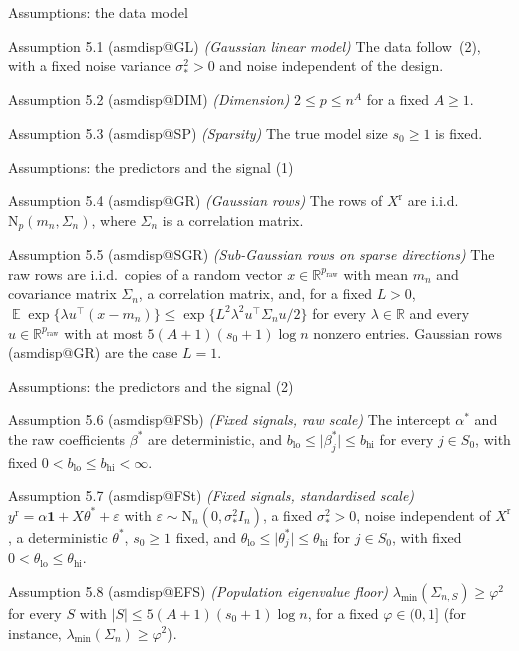 \documentclass[aspectratio=169]{beamer}
\makeatletter
\newcommand{\asmdisp}[1]{\csname asmdisp@#1\endcsname}
\newcommand{\as}[1]{\textup{(\asmdisp{#1})}}
\newcommand{\R}{\mathbb{R}}
\newcommand{\one}{\mathbf{1}}
\newcommand{\abs}[1]{\lvert #1\rvert}
\DeclareMathOperator{\E}{\mathbb{E}}
\newcommand{\Normal}{\mathrm{N}}
\newcommand{\lmin}{\lambda_{\min}}
\newcommand{\yr}{y^{\mathrm r}}
\newcommand{\Xr}{X^{\mathrm r}}
\newcommand{\praw}{p_{\mathrm{raw}}}
\newcommand{\sigs}{\sigma_*}
\newcommand{\bstar}{\beta^*}
\newcommand{\tstar}{\theta^*}
\newcommand{\Sz}{S_0}
\newcommand{\sz}{s_0}
\newcommand{\Sig}{\Sigma_n}
\makeatother
\begin{document}
\begin{frame}{Assumptions: the data model}
\small
\begin{block}{Assumption 5.1 (\asmdisp{GL}) \textit{(Gaussian linear model)}}
The data follow~\textup{(2)}, with a fixed noise variance $\sigs^2>0$ and noise independent of the design.
\end{block}
\begin{block}{Assumption 5.2 (\asmdisp{DIM}) \textit{(Dimension)}}
$2\le p\le n^A$ for a fixed $A\ge1$.
\end{block}
\begin{block}{Assumption 5.3 (\asmdisp{SP}) \textit{(Sparsity)}}
The true model size $\sz\ge1$ is fixed.
\end{block}
\end{frame}

\begin{frame}{Assumptions: the predictors and the signal (1)}
\small
\begin{block}{Assumption 5.4 (\asmdisp{GR}) \textit{(Gaussian rows)}}
The rows of $\Xr$ are i.i.d.\ $\Normal_p(m_n,\Sig)$, where $\Sig$ is a correlation matrix.
\end{block}
\begin{block}{Assumption 5.5 (\asmdisp{SGR}) \textit{(Sub-Gaussian rows on sparse directions)}}
The raw rows are i.i.d.\ copies of a random vector $x\in\R^{\praw}$ with mean $m_n$ and covariance matrix $\Sig$, a
correlation matrix, and, for a fixed $L>0$, $\E\exp\{\lambda u^\top(x-m_n)\}\le\exp\{L^2\lambda^2u^\top\Sig u/2\}$ for every
$\lambda\in\R$ and every $u\in\R^{\praw}$ with at most $5(A+1)(\sz+1)\log n$ nonzero entries. Gaussian rows \as{GR} are
the case $L=1$.
\end{block}
\end{frame}

\begin{frame}{Assumptions: the predictors and the signal (2)}
\small
\begin{block}{Assumption 5.6 (\asmdisp{FSb}) \textit{(Fixed signals, raw scale)}}
The intercept $\alpha^*$ and the raw coefficients $\bstar$ are deterministic, and
$b_{\mathrm{lo}}\le\abs{\beta^*_j}\le b_{\mathrm{hi}}$ for every $j\in\Sz$, with fixed $0<b_{\mathrm{lo}}\le b_{\mathrm{hi}}<\infty$.
\end{block}
\begin{block}{Assumption 5.7 (\asmdisp{FSt}) \textit{(Fixed signals, standardised scale)}}
$\yr=\alpha\one+X\tstar+\varepsilon$ with $\varepsilon\sim\Normal_n(0,\sigs^2I_n)$, a fixed $\sigs^2>0$, noise independent
of $\Xr$, a deterministic $\tstar$, $\sz\ge1$ fixed, and $\theta_{\mathrm{lo}}\le\abs{\theta^*_j}\le\theta_{\mathrm{hi}}$ for
$j\in\Sz$, with fixed $0<\theta_{\mathrm{lo}}\le\theta_{\mathrm{hi}}$.
\end{block}
\begin{block}{Assumption 5.8 (\asmdisp{EFS}) \textit{(Population eigenvalue floor)}}
$\lmin(\Sigma_{n,S})\ge\varphi^2$ for every $S$ with $\abs{S}\le5(A+1)(\sz+1)\log n$, for a fixed $\varphi\in(0,1]$ (for
instance, $\lmin(\Sig)\ge\varphi^2$).
\end{block}
\end{frame}
\end{document}
